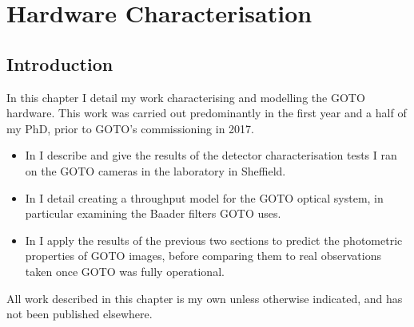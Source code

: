 \chapter{Hardware Characterisation}
\label{chap:hardware}
\chaptoc{}


\newpage
\section{Introduction}
\label{sec:hardware_intro}
\begin{colsection}

In this chapter I detail my work characterising and modelling the GOTO hardware. This work was carried out predominantly in the first year and a half of my PhD, prior to GOTO's commissioning in 2017.
%
\begin{itemize}
    \item In  I describe and give the results of the detector characterisation tests I ran on the GOTO cameras in the laboratory in Sheffield.
    \item In  I detail creating a throughput model for the GOTO optical system, in particular examining the Baader filters GOTO uses.
    \item In  I apply the results of the previous two sections to predict the photometric properties of GOTO images, before comparing them to real observations taken once GOTO was fully operational.
\end{itemize}
%
All work described in this chapter is my own unless otherwise indicated, and has not been published elsewhere.

\end{colsection}


\newpage
